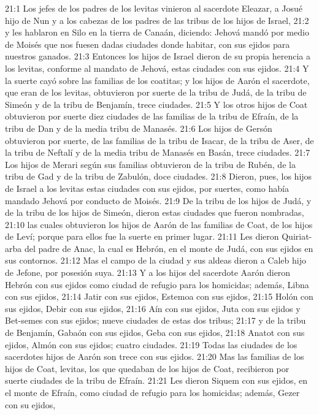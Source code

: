 21:1 Los jefes de los padres de los levitas vinieron al sacerdote Eleazar, a Josué hijo de Nun y a los cabezas de los padres de las tribus de los hijos de Israel,  
21:2 y les hablaron en Silo en la tierra de Canaán, diciendo: Jehová mandó por medio de Moisés que nos fuesen dadas ciudades donde habitar, con sus ejidos para nuestros ganados. 
21:3 Entonces los hijos de Israel dieron de su propia herencia a los levitas, conforme al mandato de Jehová, estas ciudades con sus ejidos.  
21:4 Y la suerte cayó sobre las familias de los coatitas; y los hijos de Aarón el sacerdote, que eran de los levitas, obtuvieron por suerte de la tribu de Judá, de la tribu de Simeón y de la tribu de Benjamín, trece ciudades.  
21:5 Y los otros hijos de Coat obtuvieron por suerte diez ciudades de las familias de la tribu de Efraín, de la tribu de Dan y de la media tribu de Manasés.  
21:6 Los hijos de Gersón obtuvieron por suerte, de las familias de la tribu de Isacar, de la tribu de Aser, de la tribu de Neftalí y de la media tribu de Manasés en Basán, trece ciudades.  
21:7 Los hijos de Merari según sus familias obtuvieron de la tribu de Rubén, de la tribu de Gad y de la tribu de Zabulón, doce ciudades.  
21:8 Dieron, pues, los hijos de Israel a los levitas estas ciudades con sus ejidos, por suertes, como había mandado Jehová por conducto de Moisés.  
21:9 De la tribu de los hijos de Judá, y de la tribu de los hijos de Simeón, dieron estas ciudades que fueron nombradas,  
21:10 las cuales obtuvieron los hijos de Aarón de las familias de Coat, de los hijos de Leví; porque para ellos fue la suerte en primer lugar.  
21:11 Les dieron Quiriat-arba del padre de Anac, la cual es Hebrón, en el monte de Judá, con sus ejidos en sus contornos.  
21:12 Mas el campo de la ciudad y sus aldeas dieron a Caleb hijo de Jefone, por posesión suya.  
21:13 Y a los hijos del sacerdote Aarón dieron Hebrón con sus ejidos como ciudad de refugio para los homicidas; además, Libna con sus ejidos,  
21:14 Jatir con sus ejidos, Estemoa con sus ejidos,  
21:15 Holón con sus ejidos, Debir con sus ejidos,  
21:16 Aín con sus ejidos, Juta con sus ejidos y Bet-semes con sus ejidos; nueve ciudades de estas dos tribus;  
21:17 y de la tribu de Benjamín, Gabaón con sus ejidos, Geba con sus ejidos,  
21:18 Anatot con sus ejidos, Almón con sus ejidos; cuatro ciudades.  
21:19 Todas las ciudades de los sacerdotes hijos de Aarón son trece con sus ejidos.  
21:20 Mas las familias de los hijos de Coat, levitas, los que quedaban de los hijos de Coat, recibieron por suerte ciudades de la tribu de Efraín.  
21:21 Les dieron Siquem con sus ejidos, en el monte de Efraín, como ciudad de refugio para los homicidas; además, Gezer con su ejidos,  
